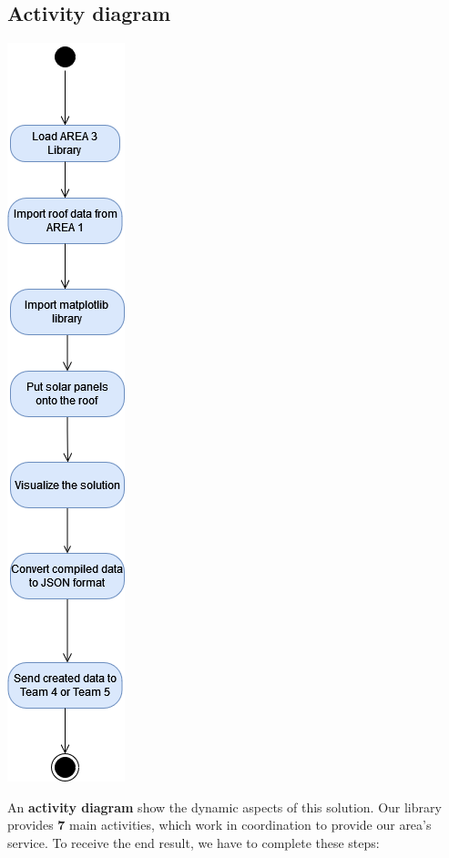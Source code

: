 \documentclass[a4paper,12pt,fleqn]{article}
\begin{document}
\subsection{Activity diagram}
\begin{center}
    \includegraphics[scale=0.6]{main/images/Activity.drawio.png}
\end{center}
An \textbf{activity diagram} show the dynamic aspects of this solution. Our library provides \textbf{7} main activities, which work in coordination to provide our area's service.
To receive the end result, we have to complete these steps:
\end{document}

